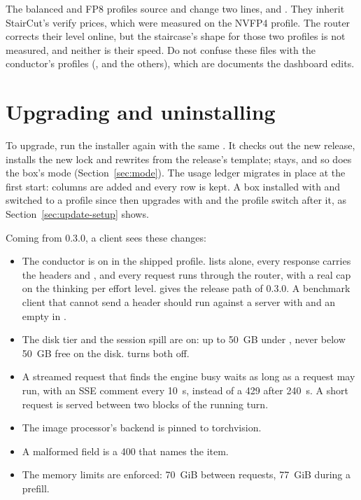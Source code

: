 The balanced and FP8 profiles source  and change two lines,  and . They inherit StairCut's verify prices, which were measured on the NVFP4 profile. The router corrects their level online, but the staircase's shape for those two profiles is not measured, and neither is their speed. Do not confuse these files with the conductor's profiles (,  and the others), which are documents the dashboard edits.

\section{Upgrading and uninstalling}

To upgrade, run the installer again with the same . It checks out the new release, installs the new lock and rewrites  from the release's template;  stays, and so does the box's mode (Section~\ref{sec:mode}). The usage ledger migrates in place at the first start: columns are added and every row is kept. A box installed with  and switched to a profile since then upgrades with  and the profile switch after it, as Section~\ref{sec:update-setup} shows.

Coming from 0.3.0, a client sees these changes:

\begin{itemize}
\item The conductor is on in the shipped profile.  lists  alone, every response carries the headers  and , and every request runs through the router, with a real cap on the thinking per effort level.  gives the release path of 0.3.0. A benchmark client that cannot send a header should run against a server with  and an empty  in .
\item The disk tier and the session spill are on: up to 50~GB under , never below 50~GB free on the disk.  turns both off.
\item A streamed request that finds the engine busy waits as long as a request may run, with an SSE comment every 10~s, instead of a 429 after 240~s. A short request is served between two blocks of the running turn.
\item The image processor's backend is pinned to torchvision.
\item A malformed  field is a 400 that names the item.
\item The memory limits are enforced: 70~GiB between requests, 77~GiB during a prefill.
\end{itemize}

